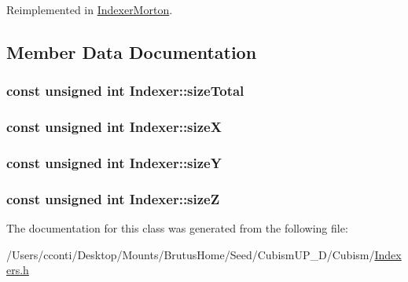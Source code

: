 Reimplemented in \hyperlink{class_indexer_morton_a73829c18adb4276a5c99d3de1a0249d8}{Indexer\+Morton}.



\subsection{Member Data Documentation}
\hypertarget{class_indexer_a502d6da55d821465c7e050cdbc873a97}{}
\subsubsection[{size\+Total}]{\setlength{\rightskip}{0pt plus 5cm}const unsigned int Indexer\+::size\+Total\hspace{0.3cm}{\ttfamily [protected]}}\label{class_indexer_a502d6da55d821465c7e050cdbc873a97}
\hypertarget{class_indexer_a676432f4a3f9853c4b32b0661abeab4b}{}
\subsubsection[{size\+X}]{\setlength{\rightskip}{0pt plus 5cm}const unsigned int Indexer\+::size\+X\hspace{0.3cm}{\ttfamily [protected]}}\label{class_indexer_a676432f4a3f9853c4b32b0661abeab4b}
\hypertarget{class_indexer_a63c52b7b6c393faaea438666b722f514}{}
\subsubsection[{size\+Y}]{\setlength{\rightskip}{0pt plus 5cm}const unsigned int Indexer\+::size\+Y\hspace{0.3cm}{\ttfamily [protected]}}\label{class_indexer_a63c52b7b6c393faaea438666b722f514}
\hypertarget{class_indexer_a054ea5515e47670dd528c1520c2fa698}{}
\subsubsection[{size\+Z}]{\setlength{\rightskip}{0pt plus 5cm}const unsigned int Indexer\+::size\+Z\hspace{0.3cm}{\ttfamily [protected]}}\label{class_indexer_a054ea5515e47670dd528c1520c2fa698}


The documentation for this class was generated from the following file\+:\begin{DoxyCompactItemize}
\item 
/\+Users/cconti/\+Desktop/\+Mounts/\+Brutus\+Home/\+Seed/\+Cubism\+U\+P\+\_\+D/\+Cubism/\hyperlink{_indexers_8h}{Indexers.\+h}\end{DoxyCompactItemize}
